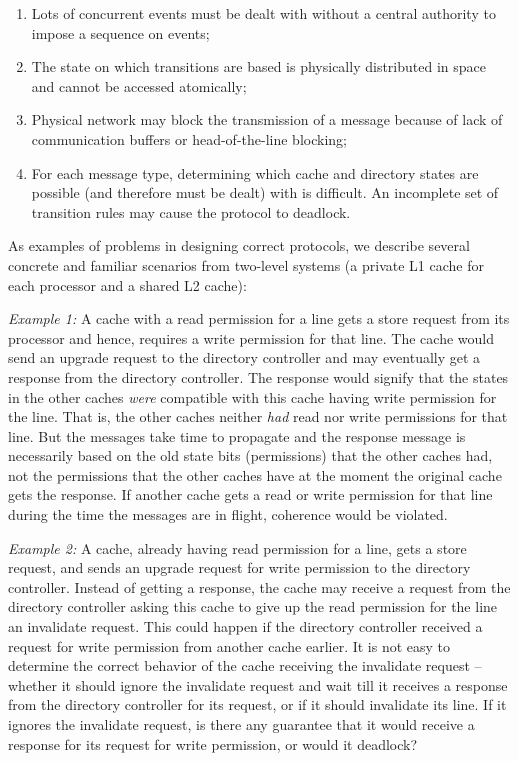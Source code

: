 \begin{enumerate}

\item Lots of concurrent events must be dealt with without a central authority
to impose a sequence on events;

\item The state on which transitions are based is physically distributed in
space and cannot be accessed atomically;

\item Physical network may block the transmission of a message because of lack
of communication buffers or head-of-the-line blocking; 

\item For each message type, determining which cache and directory states are
possible (and therefore must be dealt) with is difficult. An incomplete set of
transition rules may cause the protocol to deadlock.

\end{enumerate}

As examples of problems in designing correct protocols, we describe several
concrete and familiar scenarios from two-level systems (a private L1 cache for
each processor and a shared L2 cache):

\noindent \emph{Example 1:} A cache with a read permission for a line gets a
store request from its processor and hence, requires a write permission for
that line. The cache would send an upgrade request to the directory controller
and may eventually get a response from the directory controller. The response
would signify that the states in the other caches \emph{were} compatible with
this cache having write permission for the line. That is, the other caches
neither \emph{had} read nor write permissions for that line. But the messages
take time to propagate and the response message is necessarily based on the old
state bits (permissions) that the other caches had, not the permissions that
the other caches have at the moment the original cache gets the response. If
another cache gets a read or write permission for that line during the time the
messages are in flight, coherence would be violated.

\emph{Example 2:} A cache, already having read permission for a line, gets a
store request, and sends an upgrade request for write permission to the
directory controller. Instead of getting a response, the cache may receive a
request from the directory controller asking this cache to give up the read
permission for the line \ie an invalidate request. This could happen if the
directory controller received a request for write permission from another cache
earlier. It is not easy to determine the correct behavior of the cache
receiving the invalidate request -- whether it should ignore the invalidate
request and wait till it receives a response from the directory controller for
its request, or if it should invalidate its line. If it ignores the invalidate
request, is there any guarantee that it would receive a response for its
request for write permission, or would it deadlock?

